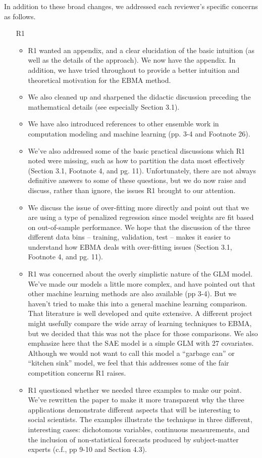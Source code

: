 \documentclass[10pt]{article}
\begin{document}
In addition to these broad changes, we addressed each reviewer's specific concerns as follows.  
\begin{itemize}
\item[R1]
\begin{itemize}
\item R1 wanted an appendix, and a clear elucidation of the basic intuition (as well as the details of the approach).  We now have the appendix. In addition, we have tried throughout to provide a better intuition and theoretical motivation for the EBMA method.  
\item We also cleaned up and sharpened the didactic discussion preceding the mathematical details (see especially Section 3.1). 
\item We have also introduced references to other ensemble work in computation modeling and machine learning (pp. 3-4 and Footnote 26). 
\item We've also addressed some of the basic practical discussions which R1 noted were missing, such as how to partition the data most effectively (Section 3.1, Footnote 4, and pg. 11). Unfortunately, there are not always definitive answers to some of these questions, but we do now raise and discuss, rather than ignore, the issues R1 brought to our attention.
\item We discuss the issue of over-fitting more directly and point out that we are using a type of penalized regression since model weights are fit based on out-of-sample performance. We hope that the discussion of the three different data bins -- training, validation, test --  makes it easier to understand how EBMA deals with over-fitting issues (Section 3.1, Footnote 4, and pg. 11). 
\item R1 was concerned about the overly simplistic nature of the GLM model. We've made our models a little more complex, and have pointed out that other machine learning methods are also available (pp 3-4). But we haven't tried to make this into a general machine learning comparison.  That literature is well developed and quite extensive.  A different project might usefully compare the wide array of learning techniques to EBMA, but we decided that this was not the place for those comparisons.  We also emphasize here that the SAE model is a simple GLM with 27 covariates.  Although we would not want to call this model a ``garbage can'' or ``kitchen sink'' model, we feel that this addresses some of the fair competition concerns R1 raises.
\item R1 questioned whether we needed three examples to make our point. We've rewritten the paper to make it more transparent why the three applications demonstrate different aspects that will be interesting to social scientists.  The examples illustrate the technique in three different, interesting cases: dichotomous variables, continuous measurements, and the inclusion of non-statistical forecasts produced by subject-matter experts (c.f., pp 9-10 and Section 4.3).

\end{itemize}
\end{itemize}
\end{document}
